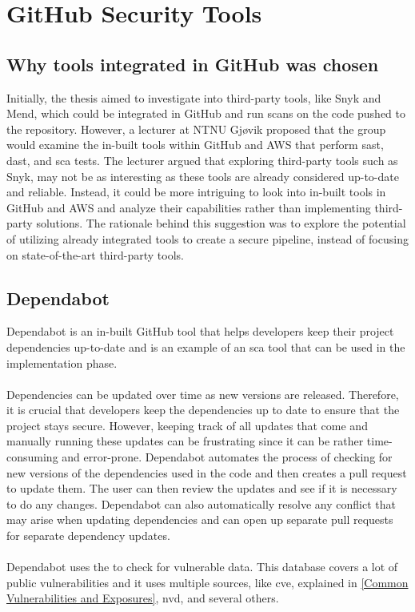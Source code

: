 \section{GitHub Security Tools}
\subsection{Why tools integrated in GitHub was chosen}
Initially, the thesis aimed to investigate into third-party tools, like Snyk and Mend, which could be integrated in GitHub and run scans on the code pushed to the repository. However, a lecturer at NTNU Gjøvik proposed that the group would examine the in-built tools within GitHub and AWS that perform \acrshort{sast}, \acrshort{dast}, and \acrshort{sca} tests. The lecturer argued that exploring third-party tools such as Snyk, may not be as interesting as these tools are already considered up-to-date and reliable. Instead, it could be more intriguing to look into  in-built tools in GitHub and AWS and analyze their capabilities rather than implementing third-party solutions. The rationale behind this suggestion was to explore the potential of utilizing already integrated tools to create a secure \gls{pipeline}, instead of focusing on state-of-the-art third-party tools. 

\subsection{Dependabot}
Dependabot is an in-built GitHub tool that helps developers keep their project dependencies up-to-date and is an example of an \acrshort{sca} tool that can be used in the implementation phase.
\\~\\
Dependencies can be updated over time as new versions are released. Therefore, it is crucial that developers keep the dependencies up to date to ensure that the project stays secure. However, keeping track of all updates that come and manually running these updates can be frustrating since it can be rather time-consuming and error-prone. Dependabot automates the process of checking for new versions of the dependencies used in the code and then creates a pull request to update them. The user can then review the updates and see if it is necessary to do any changes. 
Dependabot can also automatically resolve any conflict that may arise when updating dependencies and can open up separate pull requests for separate dependency updates. \cite{GithubDependabot2}
\\~\\
Dependabot uses the  to check for vulnerable data. This database covers a lot of public vulnerabilities and it uses multiple sources, like \acrlong{cve}, explained in \ref{Common Vulnerabilities and Exposures}, \acrlong{nvd}, and several others. \cite{GithubDependabot1}

